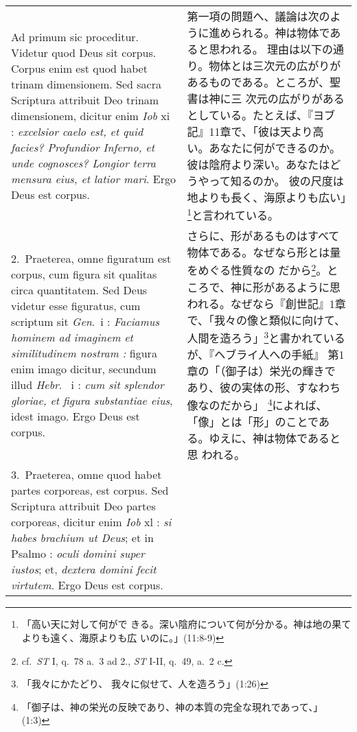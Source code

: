 \documentclass[10pt]{jsarticle} %
\begin{document}
\begin{longtable}{p{21em}p{21em}}


{\huge A}{\sc d primum sic proceditur}. Videtur quod Deus sit
corpus. Corpus enim est quod habet trinam dimensionem. Sed sacra
Scriptura attribuit Deo trinam dimensionem, dicitur enim {\it Iob} {\sc
xi} : {\it excelsior caelo est, et quid facies? Profundior Inferno, et
unde cognosces? Longior terra mensura eius, et latior mari}. Ergo Deus
est corpus.

& 

第一項の問題へ、議論は次のように進められる。神は物体であると思われる。
理由は以下の通り。物体とは三次元の広がりがあるものである。ところが、聖書は神に三
次元の広がりがあるとしている。たとえば、『ヨブ記』11章で、「彼は天より高
い。あなたに何ができるのか。彼は陰府より深い。あなたはどうやって知るのか。
彼の尺度は地よりも長く、海原よりも広い」\footnote{「高い天に対して何がで
 きる。深い陰府について何が分かる。神は地の果てよりも遠く、海原よりも広
 いのに。」(11:8-9)}と言われている。

\\


2.~{\sc Praeterea}, omne figuratum est corpus, cum figura sit qualitas
 circa quantitatem. Sed Deus videtur esse figuratus, cum scriptum sit
 {\it Gen}.~{\sc i} : {\it Faciamus hominem ad imaginem et similitudinem
 nostram :} figura enim imago dicitur, secundum illud {\it Hebr}.~{\sc
 i} : {\it cum sit splendor gloriae, et figura substantiae eius}, idest
 imago. Ergo Deus est corpus.

&

さらに、形があるものはすべて物体である。なぜなら形とは量をめぐる性質なの
 だから\footnote{cf.~{\it ST} I, q.~78 a.~3 ad 2., {\it ST} I-II, q.~49,
 a.~2 c.}。ところで、神に形があるように思われる。なぜなら『創世記』1章
 で、「我々の像と類似に向けて、人間を造ろう」\footnote{「我々にかたどり、
 我々に似せて、人を造ろう」(1:26)}と書かれているが、『ヘブライ人への手紙』
 第1章の「（御子は）栄光の輝きであり、彼の実体の形、すなわち像なのだから」
 \footnote{「御子は、神の栄光の反映であり、神の本質の完全な現れであって、」
 (1:3)}によれば、「像」とは「形」のことである。ゆえに、神は物体であると思
 われる。

\\




3.~{\sc Praeterea}, omne quod habet partes corporeas, est corpus. Sed
 Scriptura attribuit Deo partes corporeas, dicitur enim {\it Iob} {\sc
 xl} : {\it si habes brachium ut Deus}; et in Psalmo : {\it oculi domini
 super iustos}; et, {\it dextera domini fecit virtutem}. Ergo Deus est
 corpus.


\end{longtable}
\end{document}
